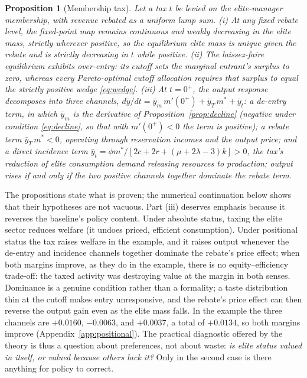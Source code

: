 \documentclass[12pt,letterpaper]{article}
\newtheorem{proposition}{Proposition}
\theoremstyle{definition}
\begin{document}
\begin{proposition}[Membership tax]\label{prop:tax} Let a tax $t$ be levied on the elite-manager membership, with revenue rebated as a uniform lump sum.
(i) At any fixed rebate level, the fixed-point map remains continuous and weakly decreasing in the elite mass, strictly wherever positive, so the equilibrium elite mass is unique given the rebate and is strictly decreasing in $t$ while positive.
(ii) The laissez-faire equilibrium exhibits over-entry: its cutoff sets the marginal entrant's surplus to zero, whereas every Pareto-optimal cutoff allocation requires that surplus to equal the strictly positive wedge \eqref{eq:wedge}.
(iii) At $t=0^{+}$, the output response decomposes into three channels, $d\bar{y}/dt = \bar{y}_m\,m'(0^{+}) + \bar{y}_T\,m^\ast + \bar{y}_t$: a de-entry term, in which $\bar{y}_m$ is the derivative of Proposition~\ref{prop:decline} (negative under condition \eqref{eq:decline}, so that with $m'(0^{+})<0$ the term is positive); a rebate term $\bar{y}_T\,m^\ast<0$, operating through reservation incomes and the output price; and a direct incidence term $\bar{y}_t = \phi m^\ast/[2c+2r+(\mu+2\lambda-3)k]>0$, the tax's reduction of elite consumption demand releasing resources to production; output rises if and only if the two positive channels together dominate the rebate term.
\end{proposition}

The propositions state what is proven; the numerical continuation below shows that their hypotheses are not vacuous.
Part (iii) deserves emphasis because it reverses the baseline's policy content.
Under absolute status, taxing the elite sector reduces welfare (it undoes priced, efficient consumption).
Under positional status the tax raises welfare in the example, and it raises output whenever the de-entry and incidence channels together dominate the rebate's price effect; when both margins improve, as they do in the example, there is no equity--efficiency trade-off: the taxed activity was destroying value at the margin in both senses.
Dominance is a genuine condition rather than a formality; a taste distribution thin at the cutoff makes entry unresponsive, and the rebate's price effect can then reverse the output gain even as the elite mass falls.
In the example the three channels are $+0.0160$, $-0.0063$, and $+0.0037$, a total of $+0.0134$, so both margins improve (Appendix~\ref{app:positional}).
The practical diagnostic offered by the theory is thus a question about preferences, not about waste: \emph{is elite status valued in itself, or valued because others lack it?}
Only in the second case is there anything for policy to correct.
\end{document}
